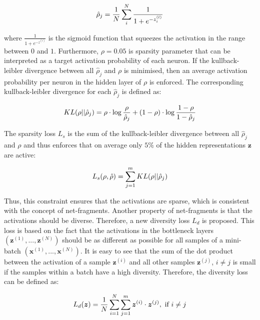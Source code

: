 \begin{equation}\eqlbl{ae_kldd}
		\hat{\rho}_j = \frac{1}{N} \sum^N_i \frac{1}{1+e^{-z^{(l)}_i}}
\end{equation}

where $\frac{1}{1+e^{-z^{(i)}}}$ is the sigmoid function that squeezes the activation in the range between $0$ and $1$. Furthermore, $\rho=0.05$ is sparsity parameter that can be interpreted as a target activation probability of each neuron. If the kullback-leibler divergence between all $\hat{\rho}_j$ and $\rho$ is minimised, then an average activation probability per neuron in the hidden layer of $\rho$ is enforced. The corresponding kullback-leibler divergence for each $\hat{\rho}_j$ is defined as:


\begin{equation}\eqlbl{ae_kld}
		KL(\rho || \hat{\rho}_j) = \rho \cdot \log \frac{\rho}{\hat{\rho}_j} + (1-\rho) \cdot \log \frac{1-\rho}{1-\hat{\rho}_j}
\end{equation}

The sparsity loss $L_{s}$ is the sum of the kullback-leibler divergence between all $\hat{\rho}_j$ and $\rho$ and thus enforces that on average only $5\%$ of the hidden representations $\boldsymbol{z}$ are active:

\begin{equation}\eqlbl{ae_kldl}
		L_{s}(\rho, \hat{\rho}) = \sum_{j=1}^{m} KL(\rho || \hat{\rho}_j)
\end{equation}

Thus, this constraint ensures that the activations are sparse, which is consistent with the concept of net-fragments.
Another property of net-fragments is that the activations should be diverse.
Therefore, a new diversity loss $L_{d}$ is proposed.
This loss is based on the fact that the activations in the bottleneck layers $(\boldsymbol{z}^{(1)}, ..., \boldsymbol{z}^{(N)})$ should be as different as possible for all samples of a mini-batch $(\boldsymbol{x}^{(1)}, ..., \boldsymbol{x}^{(N)})$.
It is easy to see that the sum of the dot product between the activation of a sample $\boldsymbol{z}^{(i)}$ and all other samples $\boldsymbol{z}^{(j)}$, $i \neq j$ is small if the samples within a batch have a high diversity. Therefore, the diversity loss can be defined as:

\begin{equation}\eqlbl{ae_kldl2}
		L_{d}(\boldsymbol{z}) = \frac{1}{N} \sum_{i=1}^N\sum_{j=1}^{m} \boldsymbol{z}^{(i)} \cdot \boldsymbol{z}^{(j)}, \text{ if } i\neq j
\end{equation}

